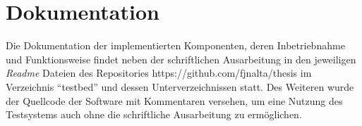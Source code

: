 \section{Dokumentation}
Die Dokumentation der implementierten Komponenten, deren Inbetriebnahme und Funktionsweise findet neben der schriftlichen Ausarbeitung in den jeweiligen \textit{Readme} Dateien des Repositories https://github.com/fjnalta/thesis im Verzeichnis "`testbed"' und dessen Unterverzeichnissen statt. Des Weiteren wurde der Quellcode der Software mit Kommentaren versehen, um eine Nutzung des Testsystems auch ohne die schriftliche Ausarbeitung zu ermöglichen.